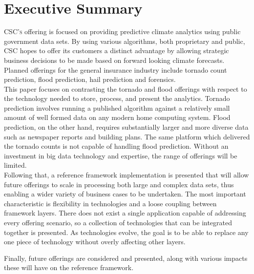 \section{Executive Summary}
\textsc{CSC's} \climatedge offering is focused on providing predictive climate analytics using public government data sets. By using various algorithms, both proprietary and public, \textsc{CSC} hopes to offer its customers a distinct advantage by allowing strategic business decisions to be made based on forward looking climate forecasts. Planned offerings for the general insurance industry include tornado count prediction, flood prediction, hail prediction and forensics.\\

This paper focuses on contrasting the tornado and flood offerings with respect to the technology needed to store, process, and present the analytics. Tornado prediction involves running a published algorithm against a relatively small amount of well formed data on any modern home computing system. Flood prediction, on the other hand, requires substantially larger and more diverse data such as newspaper reports and building plans. The same platform which delivered the tornado counts is not capable of handling flood prediction. Without an investment in big data technology and expertise, the range of \climatedge offerings will be limited.\\

Following that, a reference framework implementation is presented that will allow future \climatedge offerings to scale in processing both large and complex data sets, thus enabling a wider variety of business cases to be undertaken. The most important characteristic is flexibility in technologies and a loose coupling between framework layers. There does not exist a single application capable of addressing every offering scenario, so a collection of technologies that can be integrated together is presented. As technologies evolve, the goal is to be able to replace any one piece of technology without overly affecting other layers.

Finally, future offerings are considered and presented, along with various impacts these  will have on the reference framework.